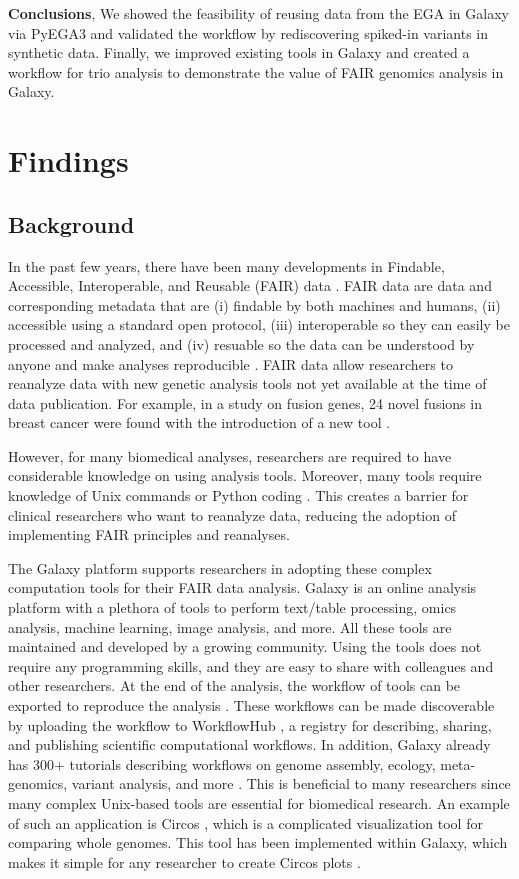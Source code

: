 \textbf{Conclusions},
We showed the feasibility of reusing data from the EGA in Galaxy via PyEGA3 and validated the workflow by rediscovering spiked-in variants in synthetic data. Finally, we improved existing tools in Galaxy and created a workflow for trio analysis to demonstrate the value of FAIR genomics analysis in Galaxy.

\section*{Findings}
\label{sec:finding}

\subsection*{Background}
In the past few years, there have been many developments in Findable, Accessible, Interoperable, and Reusable (FAIR) data \cite{Inau2021}. FAIR data are data and corresponding metadata that are (i) findable by both machines and humans, (ii) accessible using a standard open protocol, (iii) interoperable so they can easily be processed and analyzed, and (iv) resuable so the data can be understood by anyone and make analyses reproducible \cite{fair}. FAIR data allow researchers to reanalyze data with new genetic analysis tools not yet available at the time of data publication. For example, in a study on fusion genes, 24 novel fusions in breast cancer were found with the introduction of a new tool \cite{FusionCatcher}.

However, for many biomedical analyses, researchers are required to have considerable knowledge on using analysis tools. Moreover, many tools require knowledge of Unix commands or Python coding \cite{SnpEff, samtools, circos}. This creates a barrier for clinical researchers who want to reanalyze data, reducing the adoption of implementing FAIR principles and reanalyses.

The Galaxy platform \cite{galaxy} supports researchers in adopting these complex computation tools for their FAIR data analysis. Galaxy is an online analysis platform with a plethora of tools to perform text/table processing, omics analysis, machine learning, image analysis, and more. All these tools are maintained and developed by a growing community. Using the tools does not require any programming skills, and they are easy to share with colleagues and other researchers. At the end of the analysis, the workflow of tools can be exported to reproduce the analysis \cite{galaxy}. These workflows can be made discoverable by uploading the workflow to WorkflowHub \cite{workflowhub}, a registry for describing, sharing, and publishing scientific computational workflows. In addition, Galaxy already has 300+ tutorials describing workflows on genome assembly, ecology, meta-genomics, variant analysis, and more \cite{GTNstats}. This is beneficial to many researchers since many complex Unix-based tools are essential for biomedical research. An example of such an application is Circos \cite{circos}, which is a complicated visualization tool for comparing whole genomes. This tool has been implemented within Galaxy, which makes it simple for any researcher to create Circos plots \cite{galactic-circos}.

